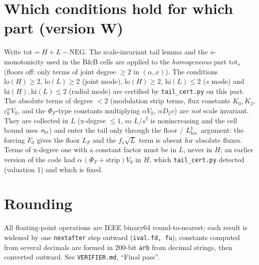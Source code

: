 \documentclass[11pt]{article}
\theoremstyle{definition}
\begin{document}
\section{Which conditions hold for which part (version W)}
Write $\mathrm{tot}=H+L-\mathrm{NEG}$. The scale-invariant tail lemma and the $s$-monotonicity used in the B\&B cells are applied to the \emph{homogeneous} part $\mathrm{tot}_s$ (floors off: only terms of joint degree $\ge2$ in $(\alpha,x)$). The conditions $\mathrm{lo}(H)\ge2$, $\mathrm{lo}(L)\ge2$ (joint mode), $\mathrm{lo}(H)\ge2$, $\mathrm{hi}(L)\le2$ ($s$ mode) and $\mathrm{hi}(H),\mathrm{hi}(L)\le2$ (radial mode) are certified by \texttt{tail\_cert.py} on this part. The absolute terms of degree $<2$ (modulation strip terms, flux constants $K_0,K_2$, $c_0^w V_0$, and the $\Phi_F$-type constants multiplying $\alpha V_0$, $\alpha D_2v$) are \emph{not} scale invariant. They are collected in $L$ (x-degree $\le1$, so $L/s^2$ is nonincreasing and the cell bound uses $s_{\rm lo}$) and enter the tail only through the floor / $L^1_{\rm loc}$ argument: the forcing $F_0$ gives the floor $L_F$ and the $f_1\sqrt{L}$ term is absent for absolute fluxes. Terms of x-degree one with a constant factor must be in $L$, never in $H$; an earlier version of the code had $\alpha\,(\Phi_F+\mathrm{strip})V_0$ in $H$, which \texttt{tail\_cert.py} detected (valuation 1) and which is fixed.

\section{Rounding}
All floating-point operations are IEEE binary64 round-to-nearest; each result is widened by one \texttt{nextafter} step outward (\texttt{ival.fd, fu}); constants computed from several decimals are formed in 200-bit \texttt{arb} from decimal strings, then converted outward. See \texttt{VERIFIER.md}, ``Final pass''.
\end{document}
